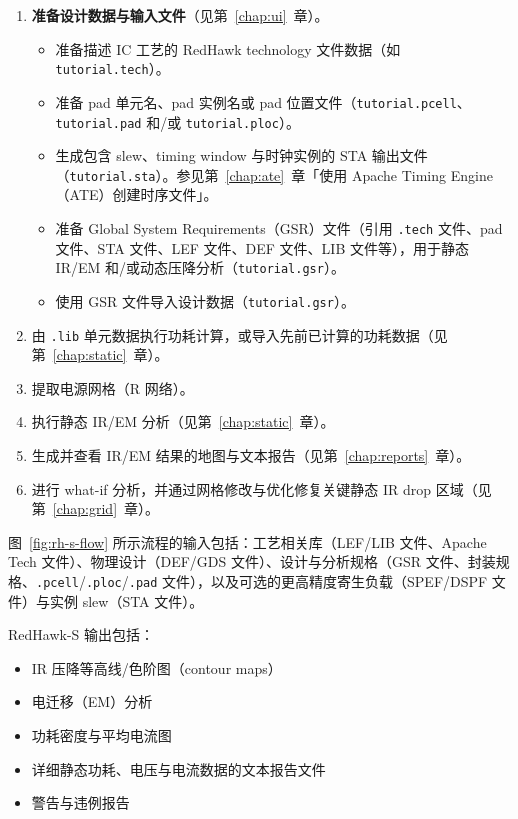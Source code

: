 \begin{enumerate}
  \item \textbf{准备设计数据与输入文件}（见第~\ref{chap:ui}~章）。
  \begin{itemize}
    \item 准备描述 IC 工艺的 RedHawk technology 文件数据（如 \texttt{tutorial.tech}）。
    \item 准备 pad 单元名、pad 实例名或 pad 位置文件（\texttt{tutorial.pcell}、\texttt{tutorial.pad} 和/或 \texttt{tutorial.ploc}）。
    \item 生成包含 slew、timing window 与时钟实例的 STA 输出文件（\texttt{tutorial.sta}）。参见第~\ref{chap:ate}~章「使用 Apache Timing Engine（ATE）创建时序文件」。
    \item 准备 Global System Requirements（GSR）文件（引用 \texttt{.tech} 文件、pad 文件、STA 文件、LEF 文件、DEF 文件、LIB 文件等），用于静态 IR/EM 和/或动态压降分析（\texttt{tutorial.gsr}）。
    \item 使用 GSR 文件导入设计数据（\texttt{tutorial.gsr}）。
  \end{itemize}
  \item 由 \texttt{.lib} 单元数据执行功耗计算，或导入先前已计算的功耗数据（见第~\ref{chap:static}~章）。
  \item 提取电源网格（R 网络）。
  \item 执行静态 IR/EM 分析（见第~\ref{chap:static}~章）。
  \item 生成并查看 IR/EM 结果的地图与文本报告（见第~\ref{chap:reports}~章）。
  \item 进行 what-if 分析，并通过网格修改与优化修复关键静态 IR drop 区域（见第~\ref{chap:grid}~章）。
\end{enumerate}

\label{fig:rh-s-flow}

图~\ref{fig:rh-s-flow} 所示流程的输入包括：工艺相关库（LEF/LIB 文件、Apache Tech 文件）、物理设计（DEF/GDS 文件）、设计与分析规格（GSR 文件、封装规格、\texttt{.pcell}/\texttt{.ploc}/\texttt{.pad} 文件），以及可选的更高精度寄生负载（SPEF/DSPF 文件）与实例 slew（STA 文件）。

RedHawk-S 输出包括：
\begin{itemize}
  \item IR 压降等高线/色阶图（contour maps）
  \item 电迁移（EM）分析
  \item 功耗密度与平均电流图
  \item 详细静态功耗、电压与电流数据的文本报告文件
  \item 警告与违例报告
\end{itemize}

